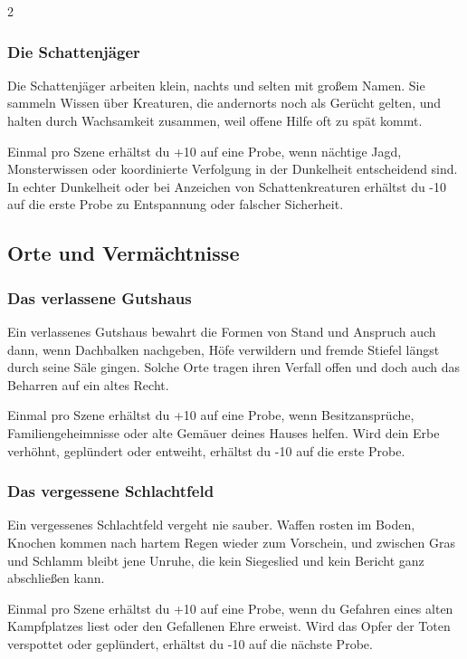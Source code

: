 {\begin{multicols*}{2}
        \subsubsection*{Die Schattenjäger}
        Die Schattenjäger arbeiten klein, nachts und selten mit großem Namen. Sie sammeln Wissen über Kreaturen, die andernorts noch als Gerücht gelten, und halten durch Wachsamkeit zusammen, weil offene Hilfe oft zu spät kommt.

        \bindungspielwertebox
        {Einmal pro Szene erhältst du +10 auf eine Probe, wenn nächtige Jagd, Monsterwissen oder koordinierte Verfolgung in der Dunkelheit entscheidend sind.}
        {In echter Dunkelheit oder bei Anzeichen von Schattenkreaturen erhältst du -10 auf die erste Probe zu Entspannung oder falscher Sicherheit.}

        \subsection{Orte und Vermächtnisse}\label{subsec:bindungen-orte}

        \subsubsection*{Das verlassene Gutshaus}
        Ein verlassenes Gutshaus bewahrt die Formen von Stand und Anspruch auch dann, wenn Dachbalken nachgeben, Höfe verwildern und fremde Stiefel längst durch seine Säle gingen. Solche Orte tragen ihren Verfall offen und doch auch das Beharren auf ein altes Recht.

        \bindungspielwertebox
        {Einmal pro Szene erhältst du +10 auf eine Probe, wenn Besitzansprüche, Familiengeheimnisse oder alte Gemäuer deines Hauses helfen.}
        {Wird dein Erbe verhöhnt, geplündert oder entweiht, erhältst du -10 auf die erste Probe.}

        \subsubsection*{Das vergessene Schlachtfeld}
        Ein vergessenes Schlachtfeld vergeht nie sauber. Waffen rosten im Boden, Knochen kommen nach hartem Regen wieder zum Vorschein, und zwischen Gras und Schlamm bleibt jene Unruhe, die kein Siegeslied und kein Bericht ganz abschließen kann.

        \bindungspielwertebox
        {Einmal pro Szene erhältst du +10 auf eine Probe, wenn du Gefahren eines alten Kampfplatzes liest oder den Gefallenen Ehre erweist.}
        {Wird das Opfer der Toten verspottet oder geplündert, erhältst du -10 auf die nächste Probe.}


\end{multicols*}}
